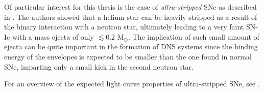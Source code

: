 \documentclass[../../main/thesis_msc.tex]{subfiles}
\begin{document}
				Of particular interest for this thesis is the case of \emph{ultra-stripped} SNe as described in \cite{Tauris_ultra, Tauris2013}. The authors showed that a helium star can be heavily stripped as a result of the binary interaction with a neutron star, ultimately leading to a very faint SN-Ic with a mass ejecta of only $\lesssim 0.2$ M$_{\odot}$. The implication of such small amount of ejecta can be quite important in the formation of DNS systems since the binding energy of the envelopes is expected to be smaller than the one found in normal SNe, imparting only a small kick in the second neutron star.
				
				For an overview of the expected light curve properties of ultra-stripped SNe, see \cite{Moriya2017}.
				

    
    
\end{document}
